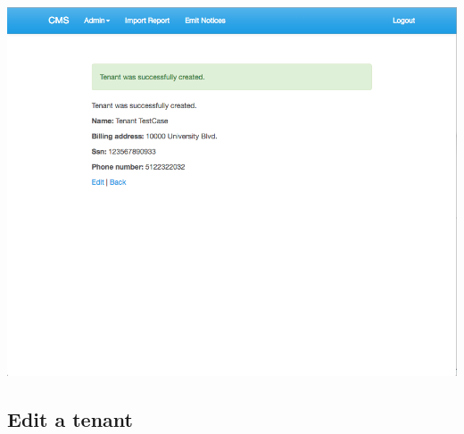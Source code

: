 \begin{itemize}
    \includegraphics[scale=0.25]{./images/ss/tenant/create/5.png}
\end{itemize}

\subsection*{Edit a tenant}

